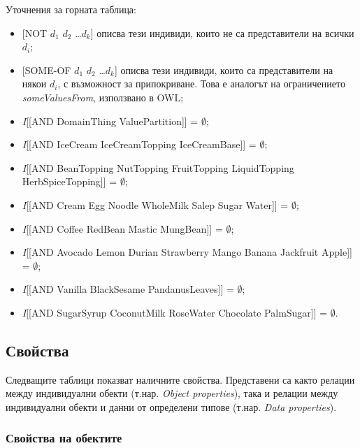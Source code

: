 \documentclass[12pt]{article}
\begin{document}
    Уточнения за горната таблица:

        \begin{itemize} 
            \item{} [NOT $d_1$ $d_2$ \ldots $d_k$] описва тези индивиди, които не са представители на всички $d_i$;
            \item{} [SOME-OF $d_1$ $d_2$ \ldots $d_k$] описва тези индивиди, които са представители на някои $d_i$, с възможност за припокриване. Това е аналогът на ограничението \textit{someValuesFrom}, използвано в OWL;
            \item{} \textit{I}[[AND DomainThing ValuePartition]] = $\emptyset$;
            \item{} \textit{I}[[AND IceCream IceCreamTopping IceCreamBase]] = $\emptyset$;
            \item{} \textit{I}[[AND BeanTopping NutTopping FruitTopping LiquidTopping HerbSpiceTopping]] = $\emptyset$;
            \item{} \textit{I}[[AND Cream Egg Noodle WholeMilk Salep Sugar Water]] = $\emptyset$;
            \item{} \textit{I}[[AND Coffee RedBean Mastic MungBean]] = $\emptyset$;
            \item{} \textit{I}[[AND Avocado Lemon Durian Strawberry Mango Banana Jackfruit Apple]] = $\emptyset$;
            \item{} \textit{I}[[AND Vanilla BlackSesame PandanusLeaves]] = $\emptyset$;
            \item{} \textit{I}[[AND SugarSyrup CoconutMilk RoseWater Chocolate PalmSugar]] = $\emptyset$.
        \end{itemize}
    
    \subsection{Свойства}

    Следващите таблици показват наличните свойства. Представени са както релации между индивидуални обекти (т.нар. \textit{Object properties}), така и релации между индивидуални обекти и данни от определени типове (т.нар. \textit{Data properties}).
    
        \subsubsection{Свойства на обектите}
    
\end{document}
